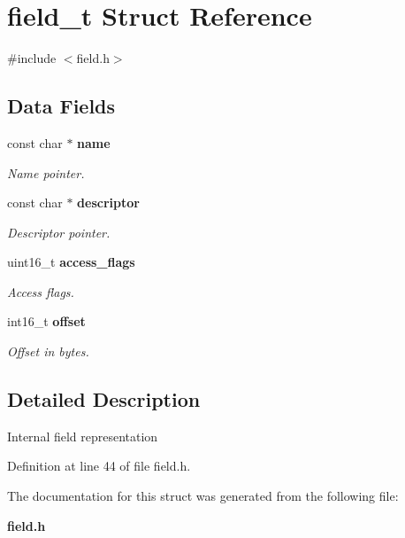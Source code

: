 \section{field\_\-t Struct Reference}
\label{structfield__t}


{\ttfamily \#include $<$field.h$>$}

\subsection*{Data Fields}
\begin{DoxyCompactItemize}
\item 
const char $\ast$ {\bf name}\label{structfield__t_a2a6fd8ac7b6961e04653157153d0b82b}

\begin{DoxyCompactList}\small\item\em Name pointer. \item\end{DoxyCompactList}\item 
const char $\ast$ {\bf descriptor}\label{structfield__t_a5debe0110eaa5140a0d0bf7005d0d2b1}

\begin{DoxyCompactList}\small\item\em Descriptor pointer. \item\end{DoxyCompactList}\item 
uint16\_\-t {\bf access\_\-flags}\label{structfield__t_abf1c3667fb63cead44477569ccfdb0e0}

\begin{DoxyCompactList}\small\item\em Access flags. \item\end{DoxyCompactList}\item 
int16\_\-t {\bf offset}\label{structfield__t_ac83b622557f222580350f9e0c63eeef4}

\begin{DoxyCompactList}\small\item\em Offset in bytes. \item\end{DoxyCompactList}\end{DoxyCompactItemize}


\subsection{Detailed Description}
Internal field representation 

Definition at line 44 of file field.h.



The documentation for this struct was generated from the following file:\begin{DoxyCompactItemize}
\item 
{\bf field.h}\end{DoxyCompactItemize}
